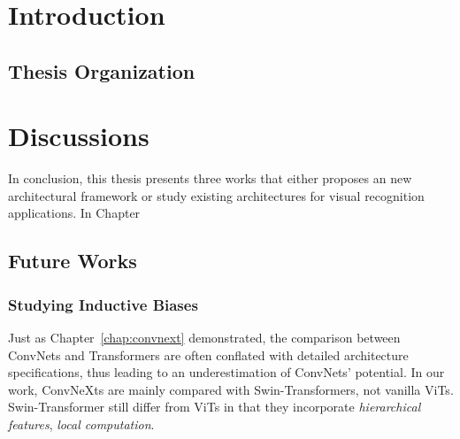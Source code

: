 \documentclass{ucbthesis}
\begin{document}
\pagestyle{headings}

\chapter{Introduction}









\section{Thesis Organization}


\graphicspath{ {./anytime_figures/} }


\graphicspath{ {./rethinking_figures/} }


\graphicspath{ {./convnext_figures/} }


\chapter{Discussions}
In conclusion, this thesis presents three works that either proposes an new architectural framework or study existing architectures for visual recognition applications. In Chapter 

\section{Future Works}
\subsection{Studying Inductive Biases}
Just as Chapter~\ref{chap:convnext} demonstrated, the comparison between ConvNets and Transformers are often conflated with detailed architecture specifications, thus leading to an underestimation of ConvNets' potential. In our work, ConvNeXts are mainly compared with Swin-Transformers, not vanilla ViTs. Swin-Transformer still differ from ViTs in that they incorporate \emph{hierarchical features}, \emph{local computation}. 
\end{document}
